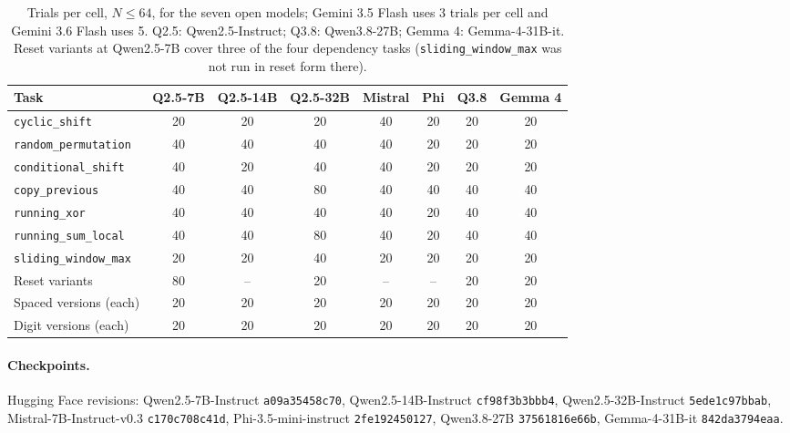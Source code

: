 \documentclass[10pt]{article} %
\newcommand{\task}[1]{\texttt{#1}}
\begin{document}
\begin{table}[!htbp]
\centering
\small
\caption{Trials per cell, $N \le 64$, for the seven open models; Gemini 3.5 Flash uses 3 trials per cell and Gemini 3.6 Flash uses 5. Q2.5: Qwen2.5-Instruct; Q3.8: Qwen3.8-27B; Gemma 4: Gemma-4-31B-it. Reset variants at Qwen2.5-7B cover three of the four dependency tasks (\task{sliding\_window\_max} was not run in reset form there).}
\label{tab:trials}
\begin{tabular}{lccccccc}
\toprule
Task & Q2.5-7B & Q2.5-14B & Q2.5-32B & Mistral & Phi & Q3.8 & Gemma 4 \\
\midrule
\task{cyclic\_shift} & 20 & 20 & 20 & 40 & 20 & 20 & 20 \\
\task{random\_permutation} & 40 & 40 & 40 & 40 & 20 & 20 & 20 \\
\task{conditional\_shift} & 40 & 20 & 40 & 40 & 20 & 20 & 20 \\
\task{copy\_previous} & 40 & 40 & 80 & 40 & 40 & 40 & 40 \\
\task{running\_xor} & 40 & 40 & 40 & 40 & 20 & 40 & 40 \\
\task{running\_sum\_local} & 40 & 40 & 80 & 40 & 20 & 40 & 40 \\
\task{sliding\_window\_max} & 20 & 20 & 40 & 20 & 20 & 20 & 20 \\
Reset variants & 80 & -- & 20 & -- & -- & 20 & 20 \\
\midrule
Spaced versions (each) & 20 & 20 & 20 & 20 & 20 & 20 & 20 \\
Digit versions (each) & 20 & 20 & 20 & 20 & 20 & 20 & 20 \\
\bottomrule
\end{tabular}
\end{table}

\paragraph{Checkpoints.} Hugging Face revisions: Qwen2.5-7B-Instruct \texttt{a09a35458c70},
Qwen2.5-14B-Instruct \texttt{cf98f3b3bbb4}, Qwen2.5-32B-Instruct \texttt{5ede1c97bbab},
Mistral-7B-Instruct-v0.3 \texttt{c170c708c41d}, Phi-3.5-mini-instruct \texttt{2fe192450127},
Qwen3.8-27B \texttt{37561816e66b}, Gemma-4-31B-it \texttt{842da3794eaa}.
\end{document}
